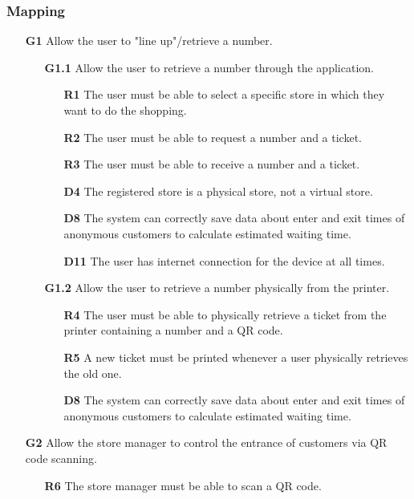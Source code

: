 \subsubsection{Mapping}	

\begin{enumerate}
	\item [\textbf{G1}] Allow the user to "line up"/retrieve a number.
	\begin{enumerate}
		\item [\textbf{G1.1}] Allow the user to retrieve a number through the application.
		\begin{enumerate}
			\item [\textbf{R1}] The user must be able to select a specific store in which they want to do the shopping.
			\item [\textbf{R2}] The user must be able to request a number and a ticket.
			\item [\textbf{R3}] The user must be able to receive a number and a ticket.
			\item [\textbf{D4}] The registered store is a physical store, not a virtual store.
			\item [\textbf{D8}] The system can correctly save data about enter and exit times of anonymous customers to calculate estimated waiting time.
			\item [\textbf{D11}] The user has internet connection for the device at all times.
		\end{enumerate}
		\item [\textbf{G1.2}] Allow the user to retrieve a number physically from the printer.
		\begin{enumerate}
			\item [\textbf{R4}] The user must be able to physically retrieve a ticket from the printer containing a number and a QR code.
			\item [\textbf{R5}] A new ticket must be printed whenever a user physically retrieves the old one.	
			\item [\textbf{D8}] The system can correctly save data about enter and exit times of anonymous customers to calculate estimated waiting time.	
		\end{enumerate}
	\end{enumerate}
	\item [\textbf{G2}] Allow the store manager to control the entrance of customers via QR code scanning.
	\begin{enumerate}
		\item [\textbf{R6}] The store manager must be able to scan a QR code.

\end{enumerate}
\end{enumerate}
